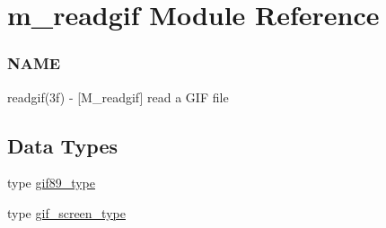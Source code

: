 \hypertarget{namespacem__readgif}{}\section{m\+\_\+readgif Module Reference}
\label{namespacem__readgif}


\subsubsection*{N\+A\+ME}

readgif(3f) -\/ \mbox{[}M\+\_\+readgif\mbox{]} read a G\+IF file  


\subsection*{Data Types}
\begin{DoxyCompactItemize}
\item 
type \hyperlink{structm__readgif_1_1gif89__type}{gif89\+\_\+type}
\item 
type \hyperlink{structm__readgif_1_1gif__screen__type}{gif\+\_\+screen\+\_\+type}
\end{DoxyCompactItemize}
